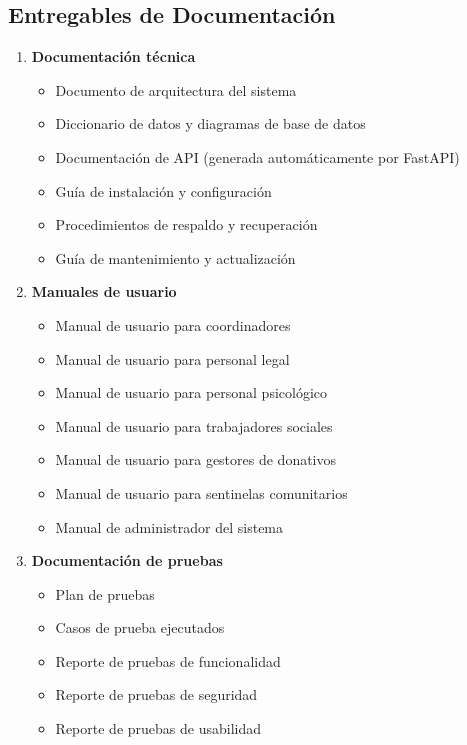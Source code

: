 \documentclass[12pt,letterpaper]{article}
\begin{document}
\subsection{Entregables de Documentación}

\begin{enumerate}
    \item \textbf{Documentación técnica}
    \begin{itemize}
        \item Documento de arquitectura del sistema
        \item Diccionario de datos y diagramas de base de datos
        \item Documentación de API (generada automáticamente por FastAPI)
        \item Guía de instalación y configuración
        \item Procedimientos de respaldo y recuperación
        \item Guía de mantenimiento y actualización
    \end{itemize}
    
    \item \textbf{Manuales de usuario}
    \begin{itemize}
        \item Manual de usuario para coordinadores
        \item Manual de usuario para personal legal
        \item Manual de usuario para personal psicológico
        \item Manual de usuario para trabajadores sociales
        \item Manual de usuario para gestores de donativos
        \item Manual de usuario para sentinelas comunitarios
        \item Manual de administrador del sistema
    \end{itemize}
    
    \item \textbf{Documentación de pruebas}
    \begin{itemize}
        \item Plan de pruebas
        \item Casos de prueba ejecutados
        \item Reporte de pruebas de funcionalidad
        \item Reporte de pruebas de seguridad
        \item Reporte de pruebas de usabilidad
    \end{itemize}
\end{enumerate}
\end{document}
